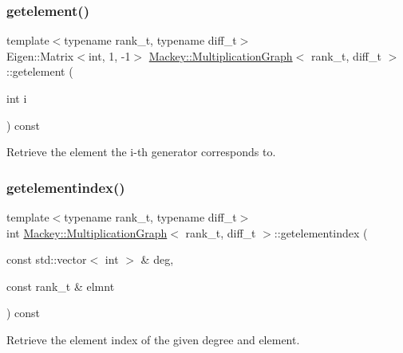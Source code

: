 \subsubsection{\texorpdfstring{getelement()}{getelement()}}
{\footnotesize\ttfamily template$<$typename rank\+\_\+t, typename diff\+\_\+t$>$ \\
Eigen\+::\+Matrix$<$int, 1, -\/1$>$ \hyperlink{classMackey_1_1MultiplicationGraph}{Mackey\+::\+Multiplication\+Graph}$<$ rank\+\_\+t, diff\+\_\+t $>$\+::getelement (\begin{DoxyParamCaption}\item[{int}]{i }\end{DoxyParamCaption}) const\hspace{0.3cm}{\ttfamily [inline]}}



Retrieve the element the i-\/th generator corresponds to. 

\mbox{\label{classMackey_1_1MultiplicationGraph_a2d76a0ac28dcead0d978ce6173b564f4}} 
\subsubsection{\texorpdfstring{getelementindex()}{getelementindex()}}
{\footnotesize\ttfamily template$<$typename rank\+\_\+t, typename diff\+\_\+t$>$ \\
int \hyperlink{classMackey_1_1MultiplicationGraph}{Mackey\+::\+Multiplication\+Graph}$<$ rank\+\_\+t, diff\+\_\+t $>$\+::getelementindex (\begin{DoxyParamCaption}\item[{const std\+::vector$<$ int $>$ \&}]{deg,  }\item[{const rank\+\_\+t \&}]{elmnt }\end{DoxyParamCaption}) const\hspace{0.3cm}{\ttfamily [inline]}}



Retrieve the element index of the given degree and element. 

\mbox{\label{classMackey_1_1MultiplicationGraph_a6ac7e92d6ceb6bc146f855898916449f}} 
